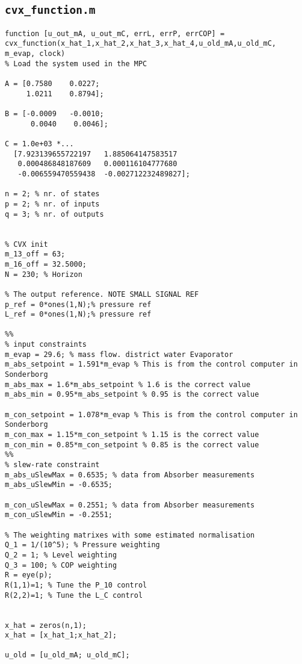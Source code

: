\subsection*{\texttt{cvx\_function.m}}
\begin{lstlisting}
function [u_out_mA, u_out_mC, errL, errP, errCOP] = cvx_function(x_hat_1,x_hat_2,x_hat_3,x_hat_4,u_old_mA,u_old_mC, m_evap, clock)
% Load the system used in the MPC

A = [0.7580    0.0227;
     1.0211    0.8794];

B = [-0.0009   -0.0010;
      0.0040    0.0046];

C = 1.0e+03 *...
  [7.923139655722197   1.885064147583517
   0.000486848187609   0.000116104777680
   -0.006559470559438  -0.002712232489827];

n = 2; % nr. of states
p = 2; % nr. of inputs
q = 3; % nr. of outputs


% CVX init
m_13_off = 63;
m_16_off = 32.5000;
N = 230; % Horizon

% The output reference. NOTE SMALL SIGNAL REF
p_ref = 0*ones(1,N);% pressure ref
L_ref = 0*ones(1,N);% pressure ref

%%
% input constraints
m_evap = 29.6; % mass flow. district water Evaporator
m_abs_setpoint = 1.591*m_evap % This is from the control computer in Sonderborg
m_abs_max = 1.6*m_abs_setpoint % 1.6 is the correct value
m_abs_min = 0.95*m_abs_setpoint % 0.95 is the correct value

m_con_setpoint = 1.078*m_evap % This is from the control computer in Sonderborg
m_con_max = 1.15*m_con_setpoint % 1.15 is the correct value
m_con_min = 0.85*m_con_setpoint % 0.85 is the correct value
%%
% slew-rate constraint
m_abs_uSlewMax = 0.6535; % data from Absorber measurements
m_abs_uSlewMin = -0.6535;

m_con_uSlewMax = 0.2551; % data from Absorber measurements
m_con_uSlewMin = -0.2551;

% The weighting matrixes with some estimated normalisation
Q_1 = 1/(10^5); % Pressure weighting
Q_2 = 1; % Level weighting
Q_3 = 100; % COP weighting
R = eye(p);
R(1,1)=1; % Tune the P_10 control 
R(2,2)=1; % Tune the L_C control


x_hat = zeros(n,1);
x_hat = [x_hat_1;x_hat_2];

u_old = [u_old_mA; u_old_mC];
 

\end{lstlisting}
